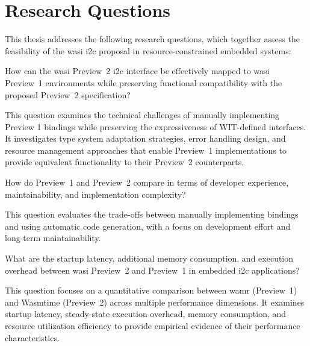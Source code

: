 \section{Research Questions}
\label{sec:research-questions}

This thesis addresses the following research questions, which together assess the feasibility of the \acrshort{wasi} \acrshort{i2c} proposal in resource-constrained embedded systems:

\begin{researchquestion}\label{rq1}
How can the \acrshort{wasi} Preview~2 \acrshort{i2c} interface be effectively mapped to \acrshort{wasi} Preview~1 environments while preserving functional compatibility with the proposed Preview~2 specification?
\end{researchquestion}

This question examines the technical challenges of manually implementing Preview 1 bindings while preserving the expressiveness of WIT-defined interfaces. It investigates type system adaptation strategies, error handling design, and resource management approaches that enable Preview~1 implementations to provide equivalent functionality to their Preview~2 counterparts.

\begin{researchquestion}\label{rq2}
How do Preview~1 and Preview~2 compare in terms of developer experience, maintainability, and implementation complexity?
\end{researchquestion}

This question evaluates the trade-offs between manually implementing bindings and using automatic code generation, with a focus on development effort and long-term maintainability.

\begin{researchquestion}\label{rq3}
What are the startup latency, additional memory consumption, and execution overhead between \acrshort{wasi} Preview~2 and Preview~1 in embedded \acrshort{i2c} applications?
\end{researchquestion}

This question focuses on a quantitative comparison between \acrshort{wamr} (Preview~1) and Wasmtime (Preview~2) across multiple performance dimensions. It examines startup latency, steady-state execution overhead, memory consumption, and resource utilization efficiency to provide empirical evidence of their performance characteristics.

